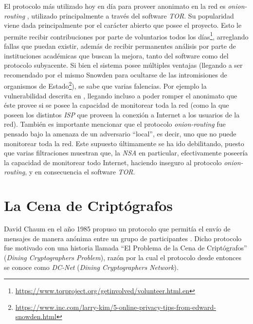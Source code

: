 El protocolo más utilizado hoy en día para proveer anonimato en la red es 
\emph{onion-routing} \cite{reed1998anonymous}, utilizado principalmente a 
través del software \emph{TOR}. Su popularidad viene dada principalmente por 
el carácter abierto que posee el proyecto. Esto le permite recibir 
contribuciones por parte de voluntarios todos los 
días\footnote{\url{https://www.torproject.org/getinvolved/volunteer.html.en}}, 
arreglando fallas que puedan existir, además de recibir permanentes análisis 
por parte de instituciones académicas que buscan la mejora, tanto del software 
como del protocolo subyacente. Si bien el sistema posee múltiples ventajas 
(llegando a ser recomendado por el mismo Snowden para ocultarse de las 
intromisiones de organismos de 
Estado\footnote{\url{https://www.inc.com/larry-kim/5-online-privacy-tips-from-edward-snowden.html}}), se sabe que 
varias falencias. Por ejemplo la vulnerabilidad descrita en 
\cite{syverson2001towards}, llegando incluso a poder romper el anonimato que 
éste provee si se posee la capacidad de monitorear toda la red (como la que 
poseen los distintos \emph{ISP} que proveen la conexión a Internet a los 
usuarios de la red). También es importante mencionar que el protocolo 
\emph{onion-routing} fue pensado bajo la amenaza de un adversario ``local'', 
es decir, uno que no puede monitorear toda la red. Este supuesto últimamente 
se ha ido debilitando, puesto que varias filtraciones muestran que, la 
\emph{NSA} en particular, efectivamente poseería la capacidad de monitorear 
todo Internet, haciendo inseguro al protocolo \emph{onion-routing}, y en 
consecuencia el software \emph{TOR}.

\section{La Cena de Criptógrafos}

David Chaum en el año 1985 propuso un protocolo que permitía el envío de 
mensajes de manera anónima entre un grupo de participantes 
\cite{Chaum:1985:SWI:4372.4373, chaum1988dining}. Dicho protocolo fue motivado 
con una historia llamada ``El Problema de la Cena de Criptógrafos'' 
(\emph{Dining Cryptographers Problem}), razón por la cual el protocolo desde 
entonces se conoce como \emph{DC-Net} (\emph{Dining Cryptographers Network}).

